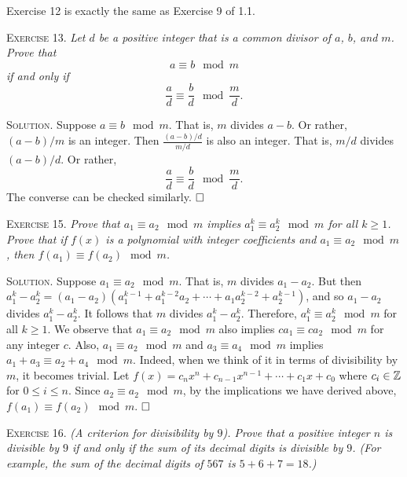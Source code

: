 \documentclass[11pt, leqno]{article}
\newcommand{\done}{\ensuremath{\hfill\square}}
\begin{document}
Exercise 12 is exactly the same as Exercise 9 of 1.1.

\textsc{Exercise 13}. \emph{Let $d$ be a positive integer that is a common divisor of $a$, $b$, and $m$. Prove that 
\begin{displaymath}
a \equiv b \mod m
\end{displaymath} if and only if 
\begin{displaymath}
\frac{a}{d} \equiv \frac{b}{d} \mod \frac{m}{d}.
\end{displaymath}}

\textsc{Solution}. Suppose $a \equiv b \mod m$. That is, $m$ divides $a-b$. Or rather, $(a-b)/m$ is an integer. Then $\frac{(a-b)/d}{m/d}$ is also an integer. That is, $m/d$ divides $(a-b)/d$. Or rather, 
\begin{displaymath}
\frac{a}{d} \equiv \frac{b}{d} \mod \frac{m}{d}.
\end{displaymath}
The converse can be checked similarly. \done

\textsc{Exercise 15}. \emph{Prove that $a_1 \equiv a_2 \mod m$ implies $a_1^k \equiv a_2^k \mod m$ for all $k \geq 1$. Prove that if $f(x)$ is a polynomial with integer coefficients and $a_1 \equiv a_2 \mod m$, then $f(a_1) \equiv f(a_2) \mod m$.}

\textsc{Solution}. Suppose $a_1 \equiv a_2 \mod m$. That is, $m$ divides $a_1 - a_2$. But then $a_1^k - a_2^k = (a_1 - a_2)(a_1^{k-1} + a_1^{k-2}a_2 + \cdots + a_1a_2^{k-2} + a_2^{k-1})$, and so $a_1 - a_2$ divides $a_1^k - a_2^k$. It follows that $m$ divides $a_1^k - a_2^k$. Therefore, $a_1^k \equiv a_2^k \mod m$ for all $k\geq 1$. We observe that $a_1 \equiv a_2 \mod m$ also implies $ca_1 \equiv ca_2 \mod m$ for any integer $c$. Also, $a_1 \equiv a_2 \mod m$ and $a_3 \equiv a_4 \mod m$ implies $a_1 + a_3 \equiv a_2 + a_4 \mod m$. Indeed, when we think of it in terms of divisibility by $m$, it becomes trivial. Let $f(x) = c_nx^n + c_{n-1}x^{n-1} + \cdots + c_1x + c_0$ where $c_i \in \mathbb{Z}$ for $0 \leq i \leq n$. Since $a_2 \equiv a_2 \mod m$, by the implications we have derived above, $f(a_1) \equiv f(a_2) \mod m$. \done

\textsc{Exercise 16}. \emph{(A criterion for divisibility by $9$). Prove that a positive integer $n$ is divisible by $9$ if and only if the sum of its decimal digits is divisible by $9$. (For example, the sum of the decimal digits of $567$ is $5+6+7 = 18$.)}
\end{document}
